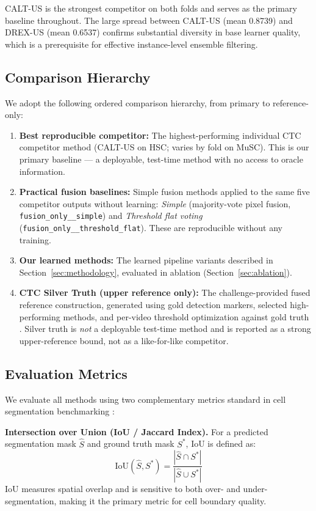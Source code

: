 CALT-US is the strongest competitor on both folds and serves as the primary baseline throughout.
The large spread between CALT-US (mean 0.8739) and DREX-US (mean 0.6537) confirms substantial
diversity in base learner quality, which is a prerequisite for effective instance-level ensemble
filtering.

\subsection{Comparison Hierarchy}
\label{sec:baselines}

We adopt the following ordered comparison hierarchy, from primary to reference-only:

\begin{enumerate}
    \item \textbf{Best reproducible competitor:} The highest-performing individual CTC competitor method (CALT-US on HSC; varies by fold on MuSC). This is our primary baseline — a deployable, test-time method with no access to oracle information.
    \item \textbf{Practical fusion baselines:} Simple fusion methods applied to the same five competitor outputs without learning: \textit{Simple} (majority-vote pixel fusion, \texttt{fusion\_only\_\_simple}) and \textit{Threshold flat voting} (\texttt{fusion\_only\_\_threshold\_flat}). These are reproducible without any training.
    \item \textbf{Our learned methods:} The learned pipeline variants described in Section~\ref{sec:methodology}, evaluated in ablation (Section~\ref{sec:ablation}).
    \item \textbf{CTC Silver Truth (upper reference only):} The challenge-provided fused reference construction, generated using gold detection markers, selected high-performing methods, and per-video threshold optimization against gold truth \cite{mavska2023cell}. Silver truth is \emph{not} a deployable test-time method and is reported as a strong upper-reference bound, not as a like-for-like competitor.
\end{enumerate}

\subsection{Evaluation Metrics}
\label{sec:metrics}
We evaluate all methods using two complementary metrics standard in cell segmentation benchmarking
\cite{mavska2023cell}:

\textbf{Intersection over Union (IoU / Jaccard Index).} For a predicted segmentation mask $\hat{S}$
and ground truth mask $S^*$, IoU is defined as:
\begin{equation}
\text{IoU}(\hat{S}, S^*) = \frac{|\hat{S} \cap S^*|}{|\hat{S} \cup S^*|}
\end{equation}
IoU measures spatial overlap and is sensitive to both over- and under-segmentation, making it the
primary metric for cell boundary quality.


